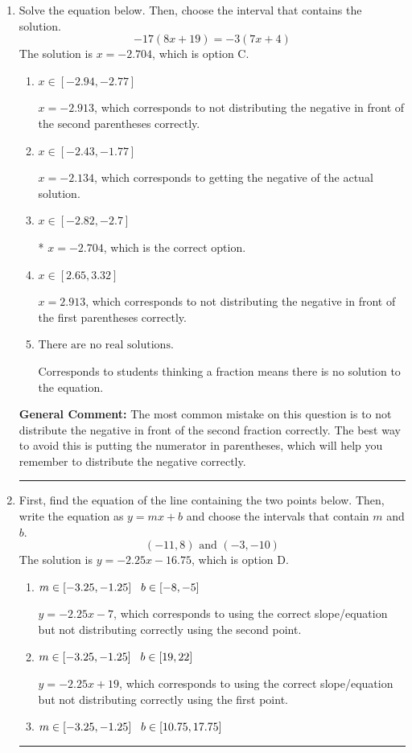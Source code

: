 \documentclass{extbook}[14pt]
\newcommand{\litem}[1]{\item #1

\rule{\textwidth}{0.4pt}}
\begin{document}
\begin{enumerate}\litem{
Solve the equation below. Then, choose the interval that contains the solution.
\[ -17(8x + 19) = -3(7x + 4) \]The solution is \( x = -2.704 \), which is option C.\begin{enumerate}[label=\Alph*.]
\item \( x \in [-2.94, -2.77] \)

$x = -2.913$, which corresponds to not distributing the negative in front of the second parentheses correctly.
\item \( x \in [-2.43, -1.77] \)

$x = -2.134$, which corresponds to getting the negative of the actual solution.
\item \( x \in [-2.82, -2.7] \)

* $x = -2.704$, which is the correct option.
\item \( x \in [2.65, 3.32] \)

$x = 2.913$, which corresponds to not distributing the negative in front of the first parentheses correctly.
\item \( \text{There are no real solutions.} \)

Corresponds to students thinking a fraction means there is no solution to the equation.
\end{enumerate}

\textbf{General Comment:} The most common mistake on this question is to not distribute the negative in front of the second fraction correctly. The best way to avoid this is putting the numerator in parentheses, which will help you remember to distribute the negative correctly.
}
\litem{
First, find the equation of the line containing the two points below. Then, write the equation as $ y=mx+b $ and choose the intervals that contain $m$ and $b$.
\[ (-11, 8) \text{ and } (-3, -10) \]The solution is \( y = -2.25x -16.75 \), which is option D.\begin{enumerate}[label=\Alph*.]
\item \( m \in [-3.25, -1.25] \hspace*{3mm} b \in [-8, -5] \)

 $y = -2.25x -7$, which corresponds to using the correct slope/equation but not distributing correctly using the second point.
\item \( m \in [-3.25, -1.25] \hspace*{3mm} b \in [19, 22] \)

 $y = -2.25x + 19$, which corresponds to using the correct slope/equation but not distributing correctly using the first point.
\item \( m \in [-3.25, -1.25] \hspace*{3mm} b \in [10.75, 17.75] \)


\end{enumerate}}
\end{enumerate}
\end{document}

